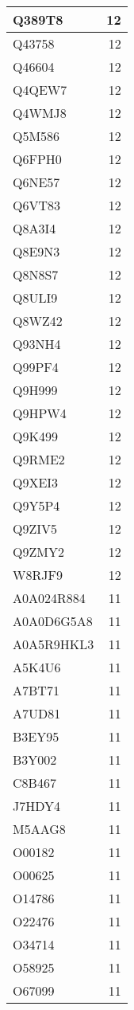 \documentclass[
]{book}
\theoremstyle{definition}
\theoremstyle{definition}
\theoremstyle{definition}
\theoremstyle{definition}
\theoremstyle{remark}
\begin{document}
\begin{table}
\begin{tabular}{l|r}
\hline
Q389T8 & 12\\
\hline
Q43758 & 12\\
\hline
Q46604 & 12\\
\hline
Q4QEW7 & 12\\
\hline
Q4WMJ8 & 12\\
\hline
Q5M586 & 12\\
\hline
Q6FPH0 & 12\\
\hline
Q6NE57 & 12\\
\hline
Q6VT83 & 12\\
\hline
Q8A3I4 & 12\\
\hline
Q8E9N3 & 12\\
\hline
Q8N8S7 & 12\\
\hline
Q8ULI9 & 12\\
\hline
Q8WZ42 & 12\\
\hline
Q93NH4 & 12\\
\hline
Q99PF4 & 12\\
\hline
Q9H999 & 12\\
\hline
Q9HPW4 & 12\\
\hline
Q9K499 & 12\\
\hline
Q9RME2 & 12\\
\hline
Q9XEI3 & 12\\
\hline
Q9Y5P4 & 12\\
\hline
Q9ZIV5 & 12\\
\hline
Q9ZMY2 & 12\\
\hline
W8RJF9 & 12\\
\hline
A0A024R884 & 11\\
\hline
A0A0D6G5A8 & 11\\
\hline
A0A5R9HKL3 & 11\\
\hline
A5K4U6 & 11\\
\hline
A7BT71 & 11\\
\hline
A7UD81 & 11\\
\hline
B3EY95 & 11\\
\hline
B3Y002 & 11\\
\hline
C8B467 & 11\\
\hline
J7HDY4 & 11\\
\hline
M5AAG8 & 11\\
\hline
O00182 & 11\\
\hline
O00625 & 11\\
\hline
O14786 & 11\\
\hline
O22476 & 11\\
\hline
O34714 & 11\\
\hline
O58925 & 11\\
\hline
O67099 & 11\\

\end{tabular}
\end{table}
\end{document}
